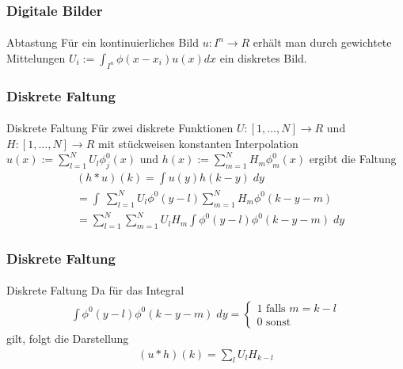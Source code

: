 \documentclass{beamer}
\begin{document}
\begin{frame}
    \frametitle{Digitale Bilder}
\framesubtitle{}
\begin{block}{Abtastung}
Für ein kontinuierliches  Bild $u : I^n \to R$ erhält man durch gewichtete Mittelungen
$U_i := \int_{I^n} \phi (x - x_i) u(x) dx$ ein diskretes Bild. 
\end{block}
 \end{frame}



\begin{frame}
    \frametitle{Diskrete Faltung}
\framesubtitle{}

    \begin{block}{Diskrete Faltung}
Für zwei diskrete  Funktionen $U : [1, \ldots, N]  \to R$ und $H : [1, \ldots, N]  \to R$ mit stückweisen konstanten Interpolation $u(x) := \sum_{l=1}^{N} U_l \phi^0_j(x)$ und 
$h(x) := \sum_{m=1}^{N} H_m \phi^0_m(x)$ ergibt die Faltung 
\begin{align*}
& (h * u)(k) = \int u(y)h(k-y)  \; dy \\
& = \int \ \sum_{l=1}^{N} U_l \phi^0(y-l) \sum_{m=1}^{N} H_m \phi^0(k-y-m) \\
& = \sum_{l=1}^{N}   \sum_{m=1}^{N} U_l  H_m  \int  \phi^0(y-l) \phi^0(k-y-m) \; dy 
\end{align*}

\end{block}
 \end{frame}

\begin{frame}
    \frametitle{Diskrete Faltung}
\framesubtitle{}

    \begin{block}{Diskrete Faltung}
Da für das Integral 
\begin{align*}
  \int  \phi^0(y-l) \phi^0(k-y-m)  \; dy  = \begin{cases}
1 \text{ falls } m = k -l\\
0 \text{ sonst }
\end{cases}
\end{align*}
gilt, folgt die Darstellung
\begin{align*}
 (u  * h)(k) = \sum_l U_l H_{k-l}
\end{align*}

\end{block}

 \end{frame}
\end{document}
